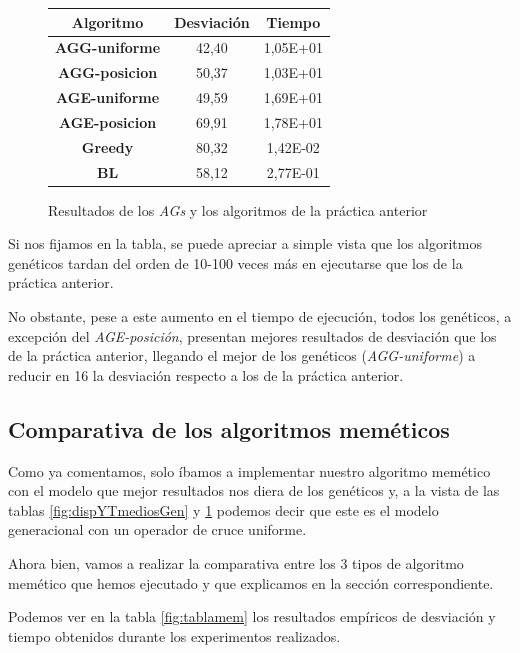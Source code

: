 \begin{figure}[H]
    \centering
    \begin{tabular}{|c|c|c|}
        \hline
        Algoritmo & \textbf{Desviación} & \textbf{Tiempo}\\
        \hline
        \textbf{AGG-uniforme} & 42,40 & 1,05E+01\\
        \hline
        \textbf{AGG-posicion} & 50,37 & 1,03E+01\\
        \hline
        \textbf{AGE-uniforme} & 49,59 & 1,69E+01\\
        \hline
        \textbf{AGE-posicion} & 69,91 & 1,78E+01\\
        \hline
        \textbf{Greedy} & 80,32 & 1,42E-02\\
        \hline
        \textbf{BL} & 58,12 & 2,77E-01\\
        \hline
    \end{tabular}
    \caption{Resultados de los \textit{AGs} y los algoritmos de la práctica anterior}
    \label{fig:tablagenp1}
\end{figure}

Si nos fijamos en la tabla, se puede apreciar a simple vista que los algoritmos genéticos tardan del orden de 10-100 veces más en ejecutarse que los de la práctica anterior.

No obstante, pese a este aumento en el tiempo de ejecución, todos los genéticos, a excepción del \textit{AGE-posición}, presentan mejores resultados de desviación que los de la práctica anterior, llegando el mejor de los genéticos (\textit{AGG-uniforme}) a reducir en 16 la desviación respecto a los de la práctica anterior.

\subsection{Comparativa de los algoritmos meméticos}

Como ya comentamos, solo íbamos a implementar nuestro algoritmo memético con el modelo que mejor resultados nos diera de los genéticos y, a la vista de las tablas \ref{fig:dispYTmediosGen} y \ref{fig:tablagenp1} podemos decir que este es el modelo generacional con un operador de cruce uniforme.

Ahora bien, vamos a realizar la comparativa entre los 3 tipos de algoritmo memético que hemos ejecutado y que explicamos en la sección correspondiente.

Podemos ver en la tabla \ref{fig:tablamem} los resultados empíricos de desviación y tiempo obtenidos durante los experimentos realizados.

